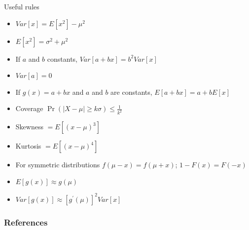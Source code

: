 \documentclass[11pt,table]{beamer}
\begin{document}
\begin{frame}{Useful rules}
\renewcommand{\baselinestretch}{1.45}

\begin{itemize}
	\item $Var[x] = E[x^{2}] - \mu^{2}$
	\item $E[x^{2}] = \sigma^{2} + \mu^{2}$
	\item If $a$ and $b$ constants, $Var[a + bx] = b^{2} Var[x]$
	\item $Var[a] = 0$
	\item If $g(x) = a + bx$ and $a$ and $b$ are constants, $E[a + bx] = a + bE[x]$
	\item Coverage $\Pr(|X-\mu|\geq k\sigma) \leq \frac{1}{k^2}$
	\item Skewness $= E[(x - \mu)^{3}]$
	\item Kurtosis $= E[(x - \mu)^{4}]$
	\item For symmetric distributions $f(\mu - x) = f(\mu + x)$; $1-F(x)=F(-x)$
	\item $E[g(x)] \approx g(\mu)$
	\item $Var[g(x)]\approx [g^{\prime}(\mu)]^{2} Var[x]$
\end{itemize}
\renewcommand{\baselinestretch}{1}

\end{frame}

\begin{frame}[t,allowframebreaks
]\nocite{*}
\frametitle{References}
\small

\end{frame}
\end{document}
